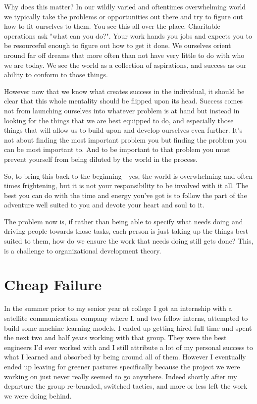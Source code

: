 \documentclass[11pt]{book}
\begin{document}
Why does this matter? In our wildly varied and oftentimes overwhelming world we typically take the problems or opportunities out there and try to figure out how to fit ourselves to them. You see this all over the place. Charitable operations ask "what can you do?". Your work hands you jobs and expects you to be resourceful enough to figure out how to get it done. We ourselves orient around far off dreams that more often than not have very little to do with who we are today. We see the world as a collection of aspirations, and success as our ability to conform to those things. 
\newline

However now that we know what creates success in the individual, it should be clear that this whole mentality should be flipped upon its head. Success comes not from launching ourselves into whatever problem is at hand but instead in looking for the things that we are best equipped to do, and especially those things that will allow us to build upon and develop ourselves even further. It's not about finding the most important problem you but finding the problem you can be most important to. And to be important to that problem you must prevent yourself from being diluted by the world in the process. 
\newline

So, to bring this back to the beginning - yes, the world is overwhelming and often times frightening, but it is not your responsibility to be involved with it all. The best you can do with the time and energy you've got is to follow the part of the adventure well suited to you and devote your heart and soul to it. 
\newline

The problem now is, if rather than being able to specify what needs doing and driving people towards those tasks, each person is just taking up the things best suited to them, how do we ensure the work that needs doing still gets done? This, is a challenge to organizational development theory. 

\chapter{Cheap Failure}
In the summer prior to my senior year at college I got an internship with a satellite communications company where I, and two fellow interns, attempted to build some machine learning models. I ended up getting hired full time and spent the next two and half years working with that group. They were the best engineers I'd ever worked with and I still attribute a lot of my personal success to what I learned and absorbed by being around all of them. However I eventually ended up leaving for greener pastures specifically because the project we were working on just never really seemed to go anywhere. Indeed shortly after my departure the group re-branded, switched tactics, and more or less left the work we were doing behind. 
\newline
\end{document}
